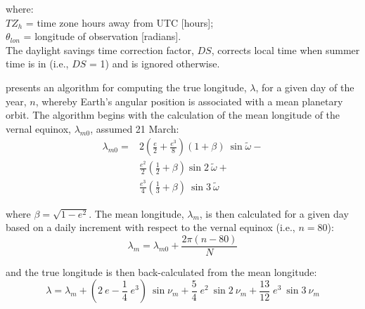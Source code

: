 \noindent where: \\
\indent $TZ_{h}$ = time zone hours away from UTC [hours];\\
\indent $\theta_{lon}$ = longitude of observation [radians].\\

The daylight savings time correction factor, $DS$, corrects local time when summer time is in (i.e., $DS$ = 1) and is ignored otherwise.

\cite{berger78} presents an algorithm for computing the true longitude, $\lambda$, for a given day of the year, $n$, whereby Earth's angular position is associated with a mean planetary orbit. 
The algorithm begins with the calculation of the mean longitude of the vernal equinox, $\lambda_{m0}$, assumed 21 March: 
\begin{equation}
\label{eq:lambdamo}
\begin{split}
	\lambda_{m0} = & 2\left(\frac{e}{2}+\frac{e^3}{8}\right)\left(1+\beta\right)\:\sin\tilde{\omega} - \\
	& \frac{e^2}{2}\left(\frac{1}{2}+\beta\right)\sin 2\: \tilde{\omega} + \\
	& \frac{e^3}{4}\left(\frac{1}{3}+\beta\right)\:\sin 3\: \tilde{\omega}
\end{split}
\end{equation}

\noindent where $\beta = \sqrt{1-e^2}$. 
The mean longitude, $\lambda_m$, is then calculated for a given day based on a daily increment with respect to the vernal equinox (i.e., $n=80$): 
\begin{equation}
\label{eq:lambdam}
	\lambda_m = \lambda_{m0} + \frac{2\pi\left(n-80\right)}{N}
\end{equation}

\noindent and the true longitude is then back-calculated from the mean longitude:
\begin{equation}
\label{eq:lambdat}
	\lambda = \lambda_m + 
	          \left( 2\: e - \frac{1}{4}\; e^3 \right)\: \sin\nu_m + 
	          \frac{5}{4}\; e^2\: \sin 2\: \nu_m + 
	          \frac{13}{12}\; e^3\:\sin 3\: \nu_m
\end{equation}

